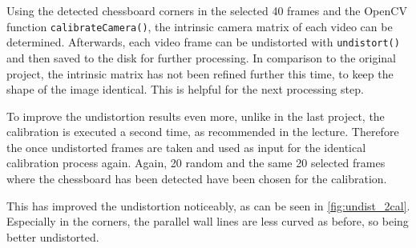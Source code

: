 Using the detected chessboard corners in the selected 40 frames and the OpenCV function \texttt{calibrateCamera()}, the intrinsic camera matrix of each video can be determined. Afterwards, each video frame can be undistorted with \texttt{undistort()} and then saved to the disk for further processing. In comparison to the original project, the intrinsic matrix has not been refined further this time, to keep the shape of the image identical. This is helpful for the next processing step.

To improve the undistortion results even more, unlike in the last project, the calibration is executed a second time, as recommended in the lecture. Therefore the once undistorted frames are taken and used as input for the identical calibration process again. Again, 20 random and the same 20 selected frames where the chessboard has been detected have been chosen for the calibration.

This has improved the undistortion noticeably, as can be seen in \autoref{fig:undist_2cal}. Especially in the corners, the parallel wall lines are less curved as before, so being better undistorted.

